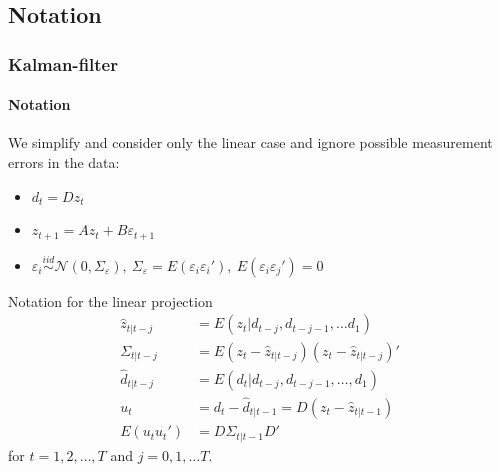 \documentclass[handout]{beamer}  %
\begin{document}
\subsection{Notation}
\begin{frame}\frametitle{Kalman-filter}\framesubtitle{Notation}
	We simplify and consider only the linear case and ignore possible measurement errors in the data:
	\begin{itemize}
		\item $d_t = D z_t$
		\item $    z_{t+1} = A z_t + B \varepsilon_{t+1}$
		\item $\varepsilon_{i} \overset{iid}{\sim} \mathcal{N}(0,\Sigma_\varepsilon),~ \Sigma_\varepsilon = E(\varepsilon_{i} \varepsilon_{i}'), ~ E(\varepsilon_{i} \varepsilon_{j}')=0$
	\end{itemize}
	\scriptsize
	\begin{block}{Notation for the linear projection}
		\begin{align*}
			{\widehat{z}_{t|t-j}} &= E({z_t}|{d_{t-j}},{d_{t-j-1}},\dots {d_{1}})\\
			{\Sigma_{t|t-j}} &= E({z_t}-{\widehat{z}_{t|t-j}})({z_t}-{\widehat{z}_{t|t-j}})'\\
			{\widehat{d}_{t|t-j}} &= E({d_t|d_{t-j}},{d_{t-j-1}},\dots,{d_1})\\
			{u_t} &= {d_t} - {\widehat{d}_{t|t-1}} = {D} ({z_t} - {\widehat{z}_{t|t-1}})\\
			E({u_t}{u_t}')&= {D} {\Sigma_{t|t-1}} {D'}
		\end{align*}
		for $t=1,2,\dots,T$ and $j=0,1,\dots T$.
	\end{block}
	
\end{frame}
\end{document}
